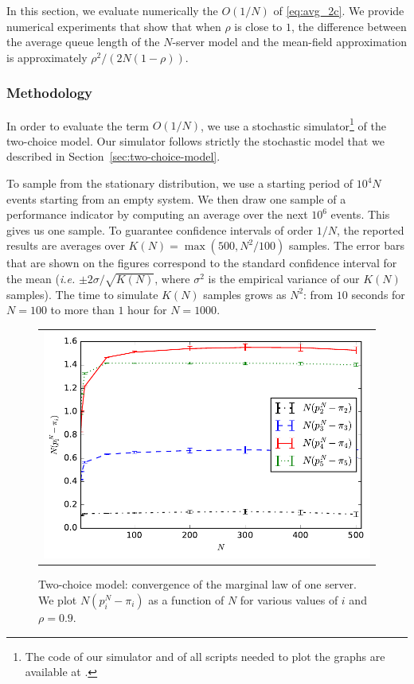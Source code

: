 \documentclass[sigconf]{acmart}
\begin{document}
In this section, we evaluate numerically the $O(1/N)$ of
\eqref{eq:avg_2c}. We provide numerical experiments that show that
when $\rho$ is close to $1$, the difference between the average queue
length of the $N$-server model and the mean-field approximation is
approximately $\rho^2/(2N(1-\rho))$.

\subsubsection{Methodology}

In order to evaluate the term $O(1/N)$, we use a stochastic
simulator\footnote{The code of our simulator and of all scripts needed
  to plot the graphs are available at \githublink.} of the two-choice
model. Our simulator follows strictly the stochastic model that we
described in Section~\ref{sec:two-choice-model}.

To sample from the stationary distribution, we use a starting period
of $10^4N$ events starting from an empty system. We then draw one
sample of a performance indicator by computing an average over the
next $10^6$ events. This gives us one sample. To guarantee confidence
intervals of order $1/N$, the reported results are averages over
$K(N)=\max(500,N^2/100)$ samples. The error bars that are shown on the
figures correspond to the standard confidence interval for the mean
(\emph{i.e.} $\pm2\sigma/\sqrt{K(N)}$, where $\sigma^2$ is the
empirical variance of our $K(N)$ samples).  The time to simulate
$K(N)$ samples grows as $N^2$: from $10$ seconds for $N=100$ to more
than $1$ hour for $N=1000$.



\begin{figure}[t]
  \centering
  \begin{tabular}{@{}c@{}}
    \includegraphics[width=\linewidth]{2choice_convergence_rho90}\\
  \end{tabular}
  \caption{Two-choice model: convergence of the marginal law of one
    server. We plot $N(p^N_i-\pi_i)$ as a function of $N$ for various
    values of $i$ and $\rho=0.9$. }
  \label{fig:2-choice_x}
\end{figure}
\end{document}
